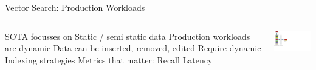 \begin{frame}{Vector Search: Production Workloads}
\begin{columns}
\centering
\begin{outline}
  \1 SOTA focusses on Static / semi static data
  \1 Production workloads are dynamic 
  \1 Data can be inserted, removed, edited
  \1 Require dynamic Indexing strategies
  \1 Metrics that matter:
  \2 Recall
  \2 Latency
\end{outline}

\begin{center}
\centering
\includegraphics[width=4.5cm, page=4, trim={0 9cm 22cm 0cm},clip]{assets/vec_db_figs.pdf}

\end{center}
\end{columns}

\end{frame}



